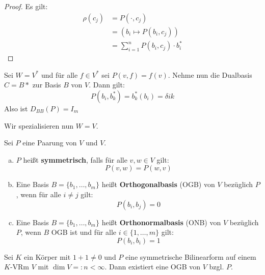 \documentclass[parskip,a4paper,twoside,DIV15,BCOR12mm]{scrbook}
\begin{document}
\begin{comment}
Mit der Dualbasis $B^*=\{b_1^*,\ldots,b_m^*\}$ von $V^*$ zu $B$ (erinnere:
$b_k^*(b_i)=\delta_{ik}$) gilt für $\rho=\eta(P):W\to V^*$:
\[\rho(c_j)=\sum_{i=1}^n P(b_i,c_j)\cdot b_i^*\]
D.h. $D_{B^*C}(\rho)=D_{BC}(P)$.
\end{comment}

\begin{proof}
Es gilt:
\begin{align*}
\rho(c_j)&=P(\cdot,c_j)\\
&=(b_i\mapsto P(b_i,c_j))\\
&=\sum_{i=1}^n P(b_i,c_j)\cdot b_i^*
\end{align*}
\end{proof}

\begin{example}
Sei $W=V^*$ und für alle $f\in V^*$ sei $P(v,f)=f(v)$. Nehme nun die Dualbasis 
$C=B*$ zur Basis $B$ von $V$. Dann gilt:
\[P(b_i,b_k^*)=b_k^*(b_i)=\delta{ik}\]
Also ist $D_{BB}(P)=I_m$
\end{example}

Wir spezialisieren nun $W=V$.

\begin{definition}
Sei $P$ eine Paarung von $V$ und $V$.
\begin{enumerate}[(a)]
\item $P$ heißt \textbf{symmetrisch}, falls für alle $v,w\in V$ gilt:
\[P(v,w)=P(w,v)\]
\item Eine Basis $B=\{b_1,\ldots,b_m\}$ heißt \textbf{Orthogonalbasis} (OGB) von $V$
bezüglich $P$, wenn für alle $i\ne j$ gilt:
\[P(b_i,b_j)=0\]
\item Eine Basis $B=\{b_1,\ldots,b_m\}$ heißt \textbf{Orthonormalbasis} (ONB) von $V$
bezüglich $P$, wenn $B$ OGB ist und für alle $i\in\{1,\ldots,m\}$ gilt:
\[P(b_i,b_i)=1\]
\end{enumerate}
\end{definition}

\begin{comment}
Falls eine OGB $B$ existiert, so ist die Fundamentalmatrix $D_{BB}(P)$ diagonal, insbesondere
symmetrisch, also ist $P$ symmetrisch.
\end{comment}

\begin{theo}
\label{Satz 15.4}
Sei $K$ ein Körper mit $1+1\ne 0$ und $P$ eine symmetrische Bilinearform auf einem
$K$-VRm $V$ mit $\dim V=:n<\infty$. Dann existiert eine OGB von $V$ bzgl. $P$.
\end{theo}
\end{document}
